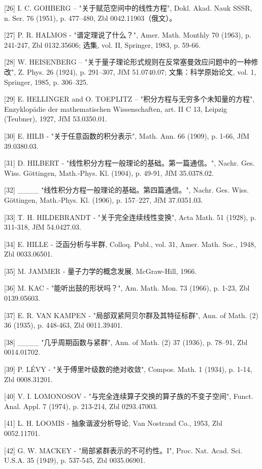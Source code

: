 {[}26{]} I. C. GOHBERG -- "关于赋范空间中的线性方程", Dokl. Akad. Nauk SSSR, n. Ser. 76 (1951), p. 477--480, Zbl 0042.11903（俄文）。

{[}27{]} P. R. HALMOS - "谱定理说了什么？", Amer. Math. Monthly 70 (1963), p. 241-247, Zbl 0132.35606; 选集, vol. II, Springer, 1983, p. 59-66.

{[}28{]} W. HEISENBERG -- "关于量子理论形式规则在反常塞曼效应问题中的一种修改", Z. Phys. 26 (1924), p. 291--307, JfM 51.0740.07; 文集：科学原始论文, vol. 1, Springer, 1985, p. 306--325.

{[}29{]} E. HELLINGER and O. TOEPLITZ -- "积分方程与无穷多个未知量的方程", Enzyklopädie der mathematischen Wissenschaften, art. II C 13, Leipzig (Teubner), 1927, JfM 53.0350.01.

{[}30{]} E. HILB - "关于任意函数的积分表示", Math. Ann. 66 (1909), p. 1-66, JfM 39.0380.03.

{[}31{]} D. HILBERT - "线性积分方程一般理论的基础。第一篇通信。", Nachr. Ges. Wiss. Göttingen, Math.-Phys. Kl. (1904), p. 49-91, JfM 35.0378.02.

{[}32{]} \_\_\_\_ "线性积分方程一般理论的基础。第四篇通信。", Nachr. Ges. Wiss. Göttingen, Math.-Phys. Kl. (1906), p. 157--227, JfM 37.0351.03.

{[}33{]} T. H. HILDEBRANDT - "关于完全连续线性变换", Acta Math. 51 (1928), p. 311-318, JfM 54.0427.03.

{[}34{]} E. HILLE - 泛函分析与半群, Colloq. Publ., vol. 31, Amer. Math. Soc., 1948, Zbl 0033.06501.

{[}35{]} M. JAMMER - 量子力学的概念发展, McGraw-Hill, 1966.

{[}36{]} M. KAC - "能听出鼓的形状吗？", Am. Math. Mon. 73 (1966), p. 1-23, Zbl 0139.05603.

{[}37{]} E. R. VAN KAMPEN - "局部双紧阿贝尔群及其特征标群", Ann. of Math. (2) 36 (1935), p. 448-463, Zbl 0011.39401.

{[}38{]} \_\_\_\_ "几乎周期函数与紧群", Ann. of Math. (2) 37 (1936), p. 78--91, Zbl 0014.01702.

{[}39{]} P. LÉVY - "关于傅里叶级数的绝对收敛", Compos. Math. 1 (1934), p. 1-14, Zbl 0008.31201.

{[}40{]} V. I. LOMONOSOV - "与完全连续算子交换的算子族的不变子空间", Funct. Anal. Appl. 7 (1974), p. 213-214, Zbl 0293.47003.

{[}41{]} L. H. LOOMIS - 抽象谐波分析导论, Van Nostrand Co., 1953, Zbl 0052.11701.

{[}42{]} G. W. MACKEY - "局部紧群表示的不可约性。I", Proc. Nat. Acad. Sci. U.S.A. 35 (1949), p. 537-545, Zbl 0035.06901.


